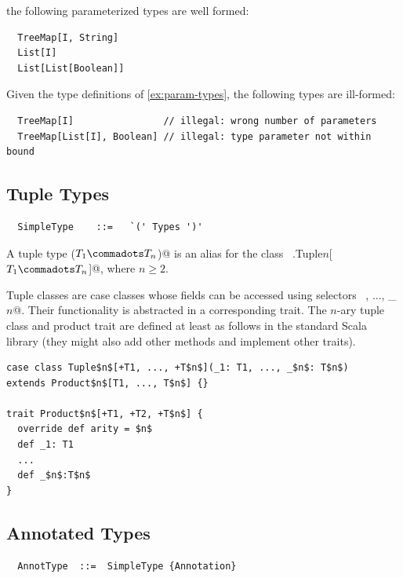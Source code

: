 the following parameterized types are well formed:

\begin{lstlisting}
  TreeMap[I, String]
  List[I]
  List[List[Boolean]]
\end{lstlisting}

\example Given the type definitions of \ref{ex:param-types},
the following types are ill-formed:

\begin{lstlisting}
  TreeMap[I]                // illegal: wrong number of parameters
  TreeMap[List[I], Boolean] // illegal: type parameter not within bound
\end{lstlisting}


\subsection{Tuple Types}\label{sec:tuple-types}

\syntax\begin{lstlisting}
  SimpleType    ::=   `(' Types ')'
\end{lstlisting}

A tuple type \lstinline@($T_1 \commadots T_n$)@ is an alias for the
class ~\lstinline@scala.Tuple$n$[$T_1 \commadots T_n$]@, where $n \geq
2$.

Tuple classes are case classes whose fields can be accessed using
selectors ~, ..., \lstinline@_$n$@. Their functionality is
abstracted in a corresponding  trait. The $n$-ary tuple
class and product trait are defined at least as follows in the
standard Scala library (they might also add other methods and
implement other traits).

\begin{lstlisting}
case class Tuple$n$[+T1, ..., +T$n$](_1: T1, ..., _$n$: T$n$) 
extends Product$n$[T1, ..., T$n$] {}

trait Product$n$[+T1, +T2, +T$n$] {
  override def arity = $n$
  def _1: T1
  ...
  def _$n$:T$n$
}
\end{lstlisting}

\subsection{Annotated Types}

\syntax\begin{lstlisting}
  AnnotType  ::=  SimpleType {Annotation}
\end{lstlisting}

